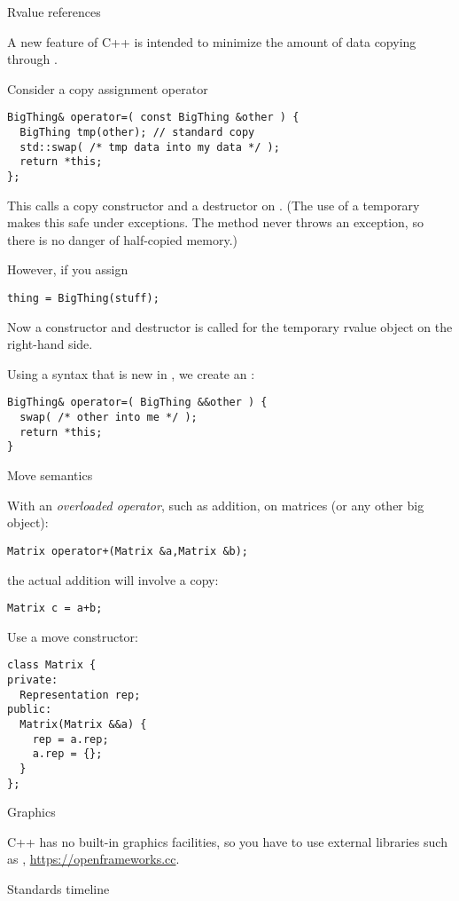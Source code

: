  {Rvalue references}
\label{sec:rvalue-ref}

A new feature of C++ is
intended to minimize the amount of data copying through
.

Consider a copy assignment operator
\begin{lstlisting}
BigThing& operator=( const BigThing &other ) {
  BigThing tmp(other); // standard copy
  std::swap( /* tmp data into my data */ );
  return *this;
};
\end{lstlisting}
This calls a copy constructor and a destructor on . (The use of
a temporary makes this safe under exceptions. The 
method never throws an exception, so there is no danger of half-copied
memory.)

However, if you assign
\begin{lstlisting}
thing = BigThing(stuff);
\end{lstlisting}
Now a constructor and destructor is called for the temporary rvalue object on
the right-hand side.

Using a syntax that is new in , we create an
:
\begin{lstlisting}
BigThing& operator=( BigThing &&other ) {
  swap( /* other into me */ );
  return *this;
}
\end{lstlisting}

 {Move semantics}

With an
\emph{overloaded operator},
such as addition,
on matrices (or any other big object):
\begin{lstlisting}
Matrix operator+(Matrix &a,Matrix &b);
\end{lstlisting}
the actual addition will involve a copy:
\begin{lstlisting}
Matrix c = a+b;
\end{lstlisting}

Use a move constructor:
\begin{lstlisting}
class Matrix {
private:
  Representation rep;
public:
  Matrix(Matrix &&a) {
    rep = a.rep;
    a.rep = {};
  }
};
\end{lstlisting}

 {Graphics}

C++ has no built-in graphics facilities, so you have to use external
libraries such as ,
\url{https://openframeworks.cc}.

 {Standards timeline}

